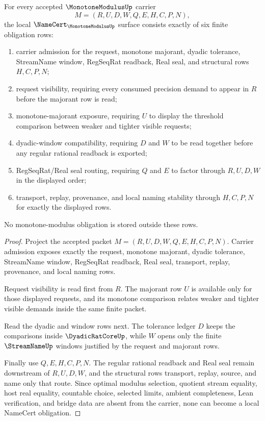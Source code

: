 \begin{theorem}
\label{thm:monotone-modulus-namecert-obligations}
For every accepted $\MonotoneModulusUp$ carrier
$$
M=(R,U,D,W,Q,E,H,C,P,N),
$$
the local $\NameCert_{\MonotoneModulusUp}$ surface consists exactly of six finite obligation rows:
\begin{enumerate}
\item carrier admission for the request, monotone majorant, dyadic tolerance, StreamName window, RegSeqRat readback, Real seal, and structural rows $H,C,P,N$;
\item request visibility, requiring every consumed precision demand to appear in $R$ before the majorant row is read;
\item monotone-majorant exposure, requiring $U$ to display the threshold comparison between weaker and tighter visible requests;
\item dyadic-window compatibility, requiring $D$ and $W$ to be read together before any regular rational readback is exported;
\item RegSeqRat/Real seal routing, requiring $Q$ and $E$ to factor through $R,U,D,W$ in the displayed order;
\item transport, replay, provenance, and local naming stability through $H,C,P,N$ for exactly the displayed rows.
\end{enumerate}
No monotone-modulus obligation is stored outside these rows.
\end{theorem}
\begin{proof}
Project the accepted packet $M=(R,U,D,W,Q,E,H,C,P,N)$. Carrier admission exposes exactly the request, monotone majorant, dyadic tolerance, StreamName window, RegSeqRat readback, Real seal, transport, replay, provenance, and local naming rows.

Request visibility is read first from $R$. The majorant row $U$ is available only for those displayed requests, and its monotone comparison relates weaker and tighter visible demands inside the same finite packet.

Read the dyadic and window rows next. The tolerance ledger $D$ keeps the comparisons inside $\DyadicRatCoreUp$, while $W$ opens only the finite $\StreamNameUp$ windows justified by the request and majorant rows.

Finally use $Q,E,H,C,P,N$. The regular rational readback and Real seal remain downstream of $R,U,D,W$, and the structural rows transport, replay, source, and name only that route. Since optimal modulus selection, quotient stream equality, host real equality, countable choice, selected limits, ambient completeness, Lean verification, and bridge data are absent from the carrier, none can become a local NameCert obligation.
\end{proof}

